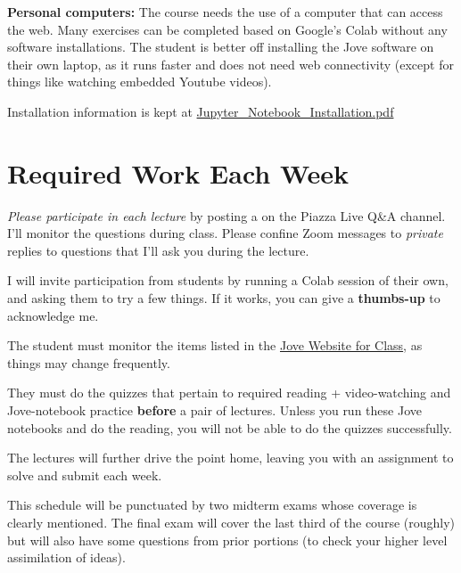 \documentclass[12pt]{article}
\newcommand{\para}[1]{{\vspace{4pt}\noindent\bf{#1:}}}
\begin{document}
\para{Personal computers} The course needs the use of a computer
that can access the web. Many exercises can be completed
based on Google's Colab without any software installations.
The student is better off installing the Jove software
on their own laptop, as it runs faster and does not need web
connectivity (except for things like watching embedded Youtube videos).

Installation information is kept at
\href{https://github.com/ganeshutah/Jove/tree/master/For_The_Public/Classic}
{Jupyter\_Notebook\_Installation.pdf}


\section{Required Work Each Week}
\label{sec:messaging}

\begin{compactitem}
\item {\em Please participate in each lecture} by posting a
  on the Piazza Live Q\&A channel.
  I'll monitor the questions during class.
  Please confine Zoom messages to {\em private} replies to questions
  that I'll ask you
  during the lecture.

\item I will invite participation from students by running a Colab session of their own,
  and asking them to try a few things. If it works, you can give a {\bf thumbs-up}
  to acknowledge me.
  
\item The student must monitor the items listed in the
  \href{https://github.com/ganeshutah/Jove/tree/master/For_CS3100_Fall2020}{Jove Website for Class}, as things may change   
 frequently.

\item They must do the quizzes that pertain to required reading +
  video-watching and Jove-notebook practice {\bf before} a pair of
  lectures. Unless you run these Jove notebooks and do the reading,
  you will not be able to do the quizzes successfully.

\item The lectures will further drive the point home, leaving you with
  an assignment to solve and submit each week.

\item This schedule will be punctuated by two midterm exams whose coverage
  is clearly mentioned. The final exam will cover the last third of the
  course (roughly) but will also have some questions from prior
  portions (to check your higher level assimilation of ideas).
\end{compactitem}
\end{document}
